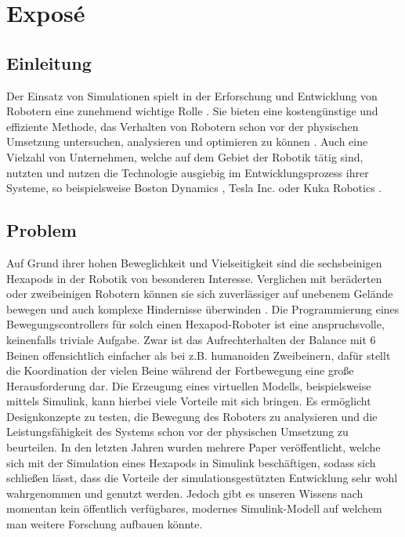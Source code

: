 \chapter{Exposé}
\label{ch:expose}



\section{Einleitung}
Der Einsatz von Simulationen spielt in der Erforschung und Entwicklung von Robotern eine zunehmend wichtige Rolle \parencite{afzal2020study}. 
Sie bieten eine kostengünstige und effiziente Methode, das Verhalten von Robotern schon vor der physischen Umsetzung untersuchen, analysieren und optimieren zu können \parencite{de2019analysis}. 
Auch eine Vielzahl von Unternehmen, welche auf dem Gebiet der Robotik tätig sind, nutzten und nutzen die Technologie ausgiebig im Entwicklungsprozess ihrer Systeme, so beispielsweise Boston Dynamics \parencite{BostonDynamicsSimulation}, Tesla Inc. \parencite{TeslaAiDay2022} oder Kuka Robotics \parencite{KukaSim}.

\section{Problem}
Auf Grund ihrer hohen Beweglichkeit und Vielseitigkeit sind die sechsbeinigen Hexapods in der Robotik von besonderen Interesse. 
Verglichen mit beräderten oder zweibeinigen Robotern können sie sich zuverlässiger auf unebenem Gelände bewegen und auch komplexe Hindernisse überwinden \parencite{barai2013smart, atifystructure}.
Die Programmierung eines Bewegungscontrollers für solch einen Hexapod-Roboter ist eine anspruchsvolle, keinenfalls triviale Aufgabe.
Zwar ist das Aufrechterhalten der Balance mit 6 Beinen offensichtlich einfacher als bei z.B. humanoiden Zweibeinern, dafür stellt die Koordination der vielen Beine während der Fortbewegung eine große Herausforderung dar.
Die Erzeugung eines virtuellen Modells, beispielsweise mittels Simulink, kann hierbei viele Vorteile mit sich bringen.
Es ermöglicht Designkonzepte zu testen, die Bewegung des Roboters zu analysieren und die Leistungsfähigkeit des Systems schon vor der physischen Umsetzung zu beurteilen.
In den letzten Jahren wurden mehrere Paper veröffentlicht, welche sich mit der Simulation eines Hexapods in Simulink beschäftigen, sodass sich schließen lässt, dass die Vorteile der simulationsgestützten Entwicklung sehr wohl wahrgenommen und genutzt werden.
Jedoch gibt es unseren Wissens nach momentan kein öffentlich verfügbares, modernes Simulink-Modell auf welchem man weitere Forschung aufbauen könnte.

